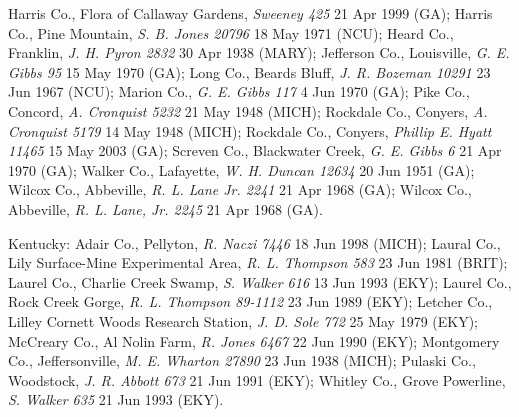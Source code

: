 \documentclass{article}
\begin{document}
Harris Co., Flora of Callaway Gardens, \textit{Sweeney 425} 21 Apr 1999 (GA);
Harris Co., Pine Mountain, \textit{S. B. Jones 20796} 18 May 1971 (NCU);
Heard Co., Franklin, \textit{J. H. Pyron 2832} 30 Apr 1938 (MARY);
Jefferson Co., Louisville, \textit{G. E. Gibbs 95} 15 May 1970 (GA);
Long Co., Beards Bluff, \textit{J. R. Bozeman 10291} 23 Jun 1967 (NCU);
Marion Co., \textit{G. E. Gibbs 117} 4 Jun 1970 (GA);
Pike Co., Concord, \textit{A. Cronquist 5232} 21 May 1948 (MICH);
Rockdale Co., Conyers, \textit{A. Cronquist 5179} 14 May 1948 (MICH);
Rockdale Co., Conyers, \textit{Phillip E. Hyatt 11465} 15 May 2003 (GA);
Screven Co., Blackwater Creek, \textit{G. E. Gibbs 6} 21 Apr 1970 (GA);
Walker Co., Lafayette, \textit{W. H. Duncan 12634} 20 Jun 1951 (GA);
Wilcox Co., Abbeville, \textit{R. L. Lane Jr. 2241} 21 Apr 1968 (GA);
Wilcox Co., Abbeville, \textit{R. L. Lane, Jr. 2245} 21 Apr 1968 (GA).

Kentucky:
Adair Co., Pellyton, \textit{R. Naczi 7446} 18 Jun 1998 (MICH);
Laural Co., Lily Surface-Mine Experimental Area, \textit{R. L. Thompson 583} 23 Jun 1981 (BRIT);
Laurel Co., Charlie Creek Swamp, \textit{S. Walker 616} 13 Jun 1993 (EKY);
Laurel Co., Rock Creek Gorge, \textit{R. L. Thompson 89-1112} 23 Jun 1989 (EKY);
Letcher Co., Lilley Cornett Woods Research Station, \textit{J. D. Sole 772} 25 May 1979 (EKY);
McCreary Co., Al Nolin Farm, \textit{R. Jones 6467} 22 Jun 1990 (EKY);
Montgomery Co., Jeffersonville, \textit{M. E. Wharton 27890} 23 Jun 1938 (MICH);
Pulaski Co., Woodstock, \textit{J. R. Abbott 673} 21 Jun 1991 (EKY);
Whitley Co., Grove Powerline, \textit{S. Walker 635} 21 Jun 1993 (EKY).
\end{document}
